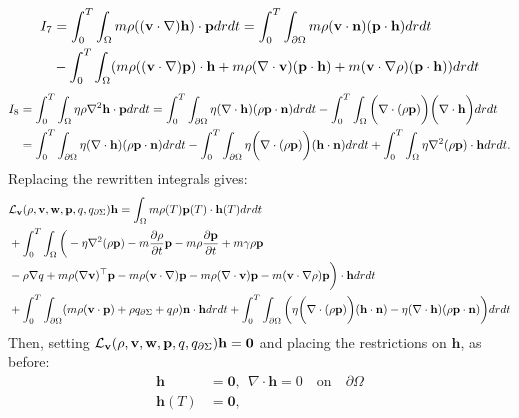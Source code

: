 \begin{align*}
I_7&=\int_0^T \int_\Omega m \rho ((\mathbf{v} \cdot \nabla)\mathbf{h}) \cdot \mathbf{p} dr dt
= \int_0^T \int_{\partial \Omega} m \rho (\mathbf{v} \cdot \mathbf{n})(\mathbf{p} \cdot \mathbf{h})dr dt \\
&- \int_0^T \int_\Omega (m \rho ((\mathbf{v} \cdot \nabla)\mathbf{p})\cdot \mathbf{h} + m \rho (\nabla \cdot \mathbf{v})(\mathbf{p} \cdot \mathbf{h}) + m (\mathbf{v} \cdot \nabla \rho)(\mathbf{p} \cdot \mathbf{h}))drdt
\end{align*}
\begin{align*}
I_8 &= \int_0^T \int_\Omega \eta \rho \nabla^2 \mathbf{h} \cdot \mathbf{p} dr dt = \int_0^T \int_{\partial \Omega} \eta (\nabla \cdot \mathbf{h}) (\rho \mathbf{p} \cdot \mathbf{n}) dr dt - \int_0^T \int_\Omega \bigg(\nabla \cdot (\rho \mathbf{p}) \bigg) \bigg(\nabla \cdot \mathbf{h}\bigg) dr dt\\
& = \int_0^T \int_{\partial \Omega} \eta (\nabla \cdot \mathbf{h}) (\rho \mathbf{p} \cdot \mathbf{n}) dr dt -  \int_0^T \int_{\partial \Omega} \eta\bigg(\nabla \cdot(\rho \mathbf{p})\bigg) (\mathbf{h} \cdot \mathbf{n}) dr dt + \int_0^T \int_\Omega \eta \nabla^2(\rho \mathbf{p}) \cdot \mathbf{h} dr dt.
\end{align*}
Replacing the rewritten integrals gives:
\begin{align*}
&\mathcal{L}_{\mathbf{v}}(\rho,\mathbf{v},\mathbf{w},\mathbf{p},q,{q}_{\partial \Sigma}) \mathbf{h} = \int_\Omega m \rho(T) \mathbf{p}(T) \cdot \mathbf{h}(T) dr dt\\
&+\int_0^T \int_\Omega 
\bigg( - \eta\nabla^2 (\rho \mathbf{p}) - m \frac{\partial \rho}{\partial t} \mathbf{p}  -  m\rho \frac{\partial \mathbf{p}}{\partial t} +m \gamma \rho \mathbf{p}\\
&-\rho\nabla q +m \rho (\nabla \mathbf{v})^\top\mathbf{p} 
-m \rho (\mathbf{v} \cdot \nabla)\mathbf{p} - m \rho (\nabla \cdot \mathbf{v})\mathbf{p}  - m (\mathbf{v} \cdot \nabla \rho)\mathbf{p}  \bigg)\cdot  \mathbf{h} drdt\\
& +\int_0^T \int_{\partial\Omega} ( m \rho (\mathbf{v} \cdot \mathbf{p})+\rho  {q}_{\partial \Sigma} + q \rho)  \mathbf{n}\cdot \mathbf{h} dr dt + \int_0^T \int_{\partial \Omega} \bigg(\eta\bigg(\nabla \cdot(\rho \mathbf{p})\bigg) (\mathbf{h} \cdot \mathbf{n}) -   \eta (\nabla \cdot \mathbf{h}) (\rho \mathbf{p} \cdot \mathbf{n}) \bigg)dr dt\\
\end{align*}
Then, setting $\mathcal{L}_{\mathbf{v}}(\rho,\mathbf{v},\mathbf{w},\mathbf{p},q,{q}_{\partial \Sigma}) \mathbf{h}=\mathbf{0}$ and placing the restrictions on $\mathbf{h}$, as before:
\begin{align*}
\mathbf{h}&=\mathbf{0}, \ \ \nabla \cdot \mathbf{h} = 0 \quad \text{on} \quad \partial \Omega\\
\mathbf{h}(T)&=\mathbf{0},
\end{align*}
